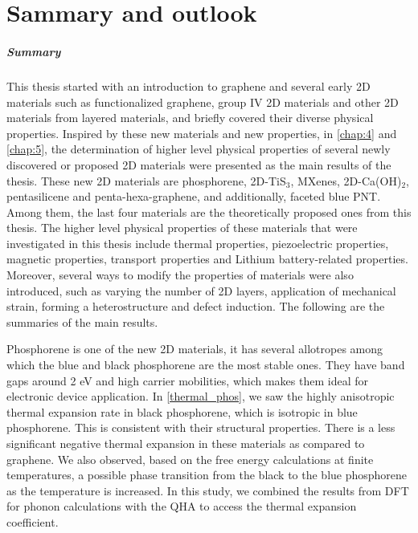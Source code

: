 
\chapter{Sammary and outlook}


\paragraph{Summary} This thesis started with an introduction to graphene and several early 2D materials such as functionalized graphene, group IV 2D materials and other 2D materials from layered materials, and briefly covered their diverse physical properties. Inspired by these new materials and new properties, in \autoref{chap:4} and \autoref{chap:5}, the determination of higher level physical properties of several newly discovered or proposed 2D materials were presented as the main results of the thesis. These new 2D materials are phosphorene, 2D-TiS$_3$, MXenes, 2D-Ca(OH)$_2$, pentasilicene and penta-hexa-graphene, and additionally, faceted blue PNT. Among them, the last four materials are the theoretically proposed ones from this thesis. The higher level physical properties of these materials that were investigated in this thesis include thermal properties, piezoelectric properties, magnetic properties, transport properties and Lithium battery-related properties. Moreover, several ways to modify the properties of materials were also introduced, such as varying the number of 2D layers, application of mechanical strain, forming a heterostructure and defect induction. The following are the summaries of the main results.

Phosphorene is one of the new 2D materials, it has several allotropes among which the blue and black phosphorene are the most stable ones. They have band gaps around 2 eV and high carrier mobilities, which makes them ideal for electronic device application. In \autoref{thermal_phos}, we saw the highly anisotropic thermal expansion rate in black phosphorene, which is isotropic in blue phosphorene. This is consistent with their structural properties. There is a less significant negative thermal expansion in these materials as compared to graphene. We also observed, based on the free energy calculations at finite temperatures, a possible phase transition from the black to the blue phosphorene as the temperature is increased. In this study, we combined the results from DFT for phonon calculations with the QHA to access the thermal expansion coefficient.

